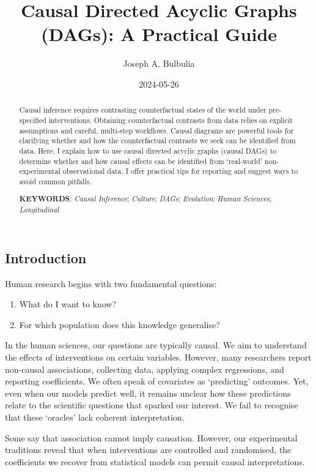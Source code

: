 \documentclass[
  single column]{article}
\title{Causal Directed Acyclic Graphs (DAGs): A Practical Guide}
\author{Joseph A. Bulbulia}
\affil{%
             \small{     Victoria University of Wellington, New Zealand
          ORCID \textcolor[HTML]{A6CE39}{\aiOrcid} ~0000-0002-5861-2056 }
              }
\date{2024-05-26}
\providecommand{\tightlist}{%
  \setlength{\itemsep}{0pt}\setlength{\parskip}{0pt}}\usepackage{longtable,booktabs,array}
\begin{document}
\maketitle
\begin{abstract}
Causal inference requires contrasting counterfactual states of the world
under pre-specified interventions. Obtaining counterfactual contrasts
from data relies on explicit assumptions and careful, multi-step
workflows. Causal diagrams are powerful tools for clarifying whether and
how the counterfactual contrasts we seek can be identified from data.
Here, I explain how to use causal directed acyclic graphs (causal DAGs)
to determine whether and how causal effects can be identified from
`real-world' non-experimental observational data. I offer practical tips
for reporting and suggest ways to avoid common pitfalls.

\textbf{KEYWORDS}: \emph{Causal Inference}; \emph{Culture}; \emph{DAGs};
\emph{Evolution}; \emph{Human Sciences}; \emph{Longitudinal}
\end{abstract}

\subsection{Introduction}\label{id-sec-introduction}

Human research begins with two fundamental questions:

\begin{enumerate}
\def\labelenumi{\arabic{enumi}.}
\tightlist
\item
  What do I want to know?
\item
  For which population does this knowledge generalise?
\end{enumerate}

In the human sciences, our questions are typically causal. We aim to
understand the effects of interventions on certain variables. However,
many researchers report non-causal associations, collecting data,
applying complex regressions, and reporting coefficients. We often speak
of covariates as `predicting' outcomes. Yet, even when our models
predict well, it remains unclear how these predictions relate to the
scientific questions that sparked our interest. We fail to recognise
that these `oracles' lack coherent interpretation.

Some say that association cannot imply causation. However, our
experimental traditions reveal that when interventions are controlled
and randomised, the coefficients we recover from statistical models can
permit causal interpretations.
\end{document}
